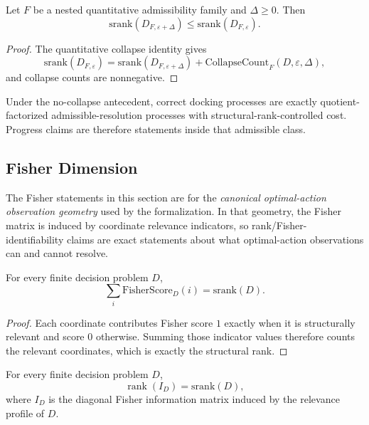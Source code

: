 \begin{theorem}\label{thm:admissibility-progress-monotone}
Let $F$ be a nested quantitative admissibility family and $\Delta \ge 0$. Then
\[
\mathrm{srank}(D_{F,\varepsilon+\Delta}) \le \mathrm{srank}(D_{F,\varepsilon}).
\]
\end{theorem}

\begin{proof}
The quantitative collapse identity gives
\[
\mathrm{srank}(D_{F,\varepsilon})=
\mathrm{srank}(D_{F,\varepsilon+\Delta})+
\mathrm{CollapseCount}_F(D,\varepsilon,\Delta),
\]
and collapse counts are nonnegative.
\end{proof}

Under the no-collapse antecedent, correct docking processes are exactly quotient-factorized admissible-resolution processes with structural-rank-controlled cost. Progress claims are therefore statements inside that admissible class.

\subsection{Fisher Dimension}

The Fisher statements in this section are for the 
\emph{canonical optimal-action observation geometry} used by the formalization. In that geometry,
the Fisher matrix is induced by coordinate relevance indicators, so rank/Fisher-identifiability
claims are exact statements about what optimal-action observations can and cannot resolve.

\begin{theorem}\label{thm:fisher-sum-srank}
For every finite decision problem $D$,
\[
\sum_i \mathrm{FisherScore}_D(i) = \mathrm{srank}(D).
\]
\end{theorem}

\begin{proof}
Each coordinate contributes Fisher score $1$ exactly when it is structurally relevant and score $0$ otherwise. Summing those indicator values therefore counts the relevant coordinates, which is exactly the structural rank.
\end{proof}

\begin{theorem}\label{thm:fisher-rank-srank}
For every finite decision problem $D$,
\[
\operatorname{rank}(I_D) = \mathrm{srank}(D),
\]
where $I_D$ is the diagonal Fisher information matrix induced by the relevance profile of $D$.
\end{theorem}

